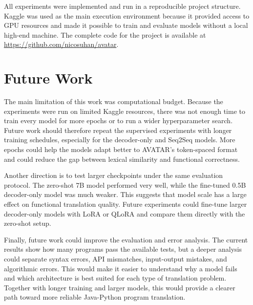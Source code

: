 All experiments were implemented and run in a reproducible project structure.
Kaggle was used as the main execution environment because it provided access to
GPU resources and made it possible to train and evaluate models without a local
high-end machine. The complete code for the project is available at
\url{https://github.com/nicosuhan/avatar}.

\section{Future Work}

\quad The main limitation of this work was computational budget. Because the
experiments were run on limited Kaggle resources, there was not enough time to
train every model for more epochs or to run a wider hyperparameter search.
Future work should therefore repeat the supervised experiments with longer
training schedules, especially for the decoder-only and Seq2Seq models. More
epochs could help the models adapt better to AVATAR's token-spaced format and
could reduce the gap between lexical similarity and functional correctness.

Another direction is to test larger checkpoints under the same evaluation
protocol. The zero-shot 7B model performed very well, while the fine-tuned
0.5B decoder-only model was much weaker. This suggests that model scale has a
large effect on functional translation quality. Future experiments could
fine-tune larger decoder-only models with LoRA or QLoRA
\cite{hu2022lora,dettmers2023qlora} and compare them directly with the
zero-shot setup.

Finally, future work could improve the evaluation and error analysis. The
current results show how many programs pass the available tests, but a deeper
analysis could separate syntax errors, API mismatches, input-output mistakes,
and algorithmic errors. This would make it easier to understand why a model
fails and which architecture is best suited for each type of translation
problem. Together with longer training and larger models, this would provide a
clearer path toward more reliable Java-Python program translation.
